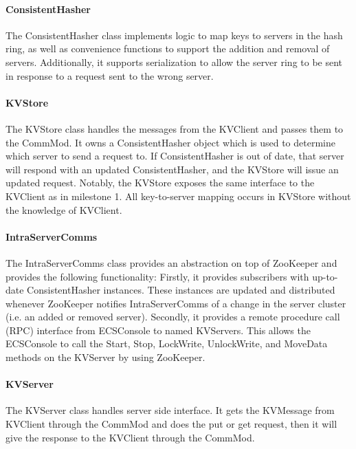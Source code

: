\documentclass[10pt]{article}
\begin{document}
\begin{multicols}{2}
\paragraph{ConsistentHasher} The ConsistentHasher class implements logic to map keys to servers in the hash ring, as well as convenience functions to support the addition and removal of servers. Additionally, it supports serialization to allow the server ring to be sent in response to a request sent to the wrong server.

\paragraph{KVStore} The KVStore class handles the messages from the KVClient and passes them to the CommMod. It owns a ConsistentHasher object which is used to determine which server to send a request to. If ConsistentHasher is out of date, that server will respond with an updated ConsistentHasher, and the KVStore will issue an updated request. Notably, the KVStore exposes the same interface to the KVClient as in milestone 1. All key-to-server mapping occurs in KVStore without the knowledge of KVClient.

\paragraph{IntraServerComms} The IntraServerComms class provides an abstraction on top of ZooKeeper and provides the following functionality: Firstly, it provides subscribers with up-to-date ConsistentHasher instances. These instances are updated and distributed whenever ZooKeeper notifies IntraServerComms of a change in the server cluster (i.e. an added or removed server). Secondly, it provides a remote procedure call (RPC) interface from ECSConsole to named KVServers. This allows the ECSConsole to call the Start, Stop, LockWrite, UnlockWrite, and MoveData methods on the KVServer by using ZooKeeper.

\paragraph{KVServer} The KVServer class handles server side interface. It gets the KVMessage from KVClient through the CommMod and does the put or get request, then it will give the response to the KVClient through the CommMod.


\end{multicols}
\end{document}
